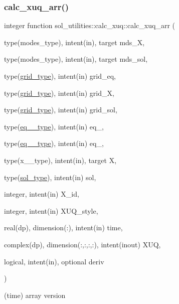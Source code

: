 \subsubsection{\texorpdfstring{calc\+\_\+xuq\+\_\+arr()}{calc\_xuq\_arr()}}
{\footnotesize\ttfamily integer function sol\+\_\+utilities\+::calc\+\_\+xuq\+::calc\+\_\+xuq\+\_\+arr (\begin{DoxyParamCaption}\item[{type(modes\+\_\+type), intent(in), target}]{mds\+\_\+X,  }\item[{type(modes\+\_\+type), intent(in), target}]{mds\+\_\+sol,  }\item[{type(\hyperlink{structgrid__vars_1_1grid__type}{grid\+\_\+type}), intent(in)}]{grid\+\_\+eq,  }\item[{type(\hyperlink{structgrid__vars_1_1grid__type}{grid\+\_\+type}), intent(in)}]{grid\+\_\+X,  }\item[{type(\hyperlink{structgrid__vars_1_1grid__type}{grid\+\_\+type}), intent(in)}]{grid\+\_\+sol,  }\item[{type(\hyperlink{structeq__vars_1_1eq__1__type}{eq\+\_\+1\+\_\+type}), intent(in)}]{eq\+\_,  }\item[{type(\hyperlink{structeq__vars_1_1eq__2__type}{eq\+\_\+2\+\_\+type}), intent(in)}]{eq\+\_,  }\item[{type(x\+\_\+1\+\_\+type), intent(in), target}]{X,  }\item[{type(\hyperlink{structsol__vars_1_1sol__type}{sol\+\_\+type}), intent(in)}]{sol,  }\item[{integer, intent(in)}]{X\+\_\+id,  }\item[{integer, intent(in)}]{X\+U\+Q\+\_\+style,  }\item[{real(dp), dimension(\+:), intent(in)}]{time,  }\item[{complex(dp), dimension(\+:,\+:,\+:,\+:), intent(inout)}]{X\+UQ,  }\item[{logical, intent(in), optional}]{deriv }\end{DoxyParamCaption})}



(time) array version 


